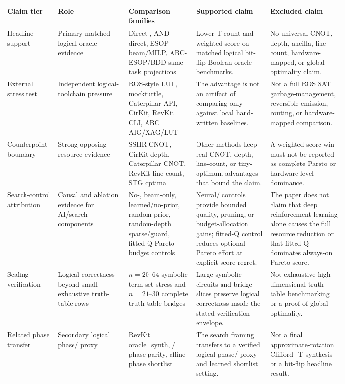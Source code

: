 \begin{tabularx}{\linewidth}{>{\raggedright\arraybackslash}p{0.15\linewidth}>{\raggedright\arraybackslash}p{0.21\linewidth}>{\raggedright\arraybackslash}X>{\raggedright\arraybackslash}p{0.22\linewidth}>{\raggedright\arraybackslash}p{0.22\linewidth}}
\toprule
Claim tier & Role & Comparison families & Supported claim & Excluded claim \\
\midrule
Headline support & Primary matched logical-oracle evidence & Direct \anf{}, AND-direct, ESOP beam/MILP, ABC-ESOP/BDD same-task projections & Lower T-count and weighted score on matched logical bit-flip Boolean-oracle benchmarks. & No universal CNOT, depth, ancilla, line-count, hardware-mapped, or global-optimality claim. \\
External stress test & Independent logical-toolchain pressure & ROS-style LUT, mockturtle, Caterpillar API, CirKit, RevKit CLI, ABC AIG/XAG/LUT & The advantage is not an artifact of comparing only against local hand-written baselines. & Not a full ROS SAT garbage-management, reversible-emission, routing, or hardware-mapped comparison. \\
Counterpoint boundary & Strong opposing-resource evidence & SSHR CNOT, CirKit depth, Caterpillar CNOT, RevKit line count, STG optima & Other methods keep real CNOT, depth, line-count, or tiny-optimum advantages that bound the claim. & A weighted-score win must not be reported as complete Pareto or hardware-level dominance. \\
Search-control attribution & Causal and ablation evidence for AI/search components & No-\mcts{}, beam-only, learned/no-prior, random-prior, random-depth, sparse/guard, fitted-Q Pareto-budget controls & Neural/\mcts{} controls provide bounded quality, pruning, or budget-allocation gains; fitted-Q control reduces optional Pareto effort at explicit score regret. & The paper does not claim that deep reinforcement learning alone causes the full resource reduction or that fitted-Q dominates always-on Pareto score. \\
Scaling verification & Logical correctness beyond small exhaustive truth-table rows & $n=20$--$64$ symbolic term-set stress and $n=21$--$30$ complete truth-table bridges & Large symbolic circuits and bridge slices preserve logical correctness inside the stated verification envelope. & Not exhaustive high-dimensional truth-table benchmarking or a proof of global optimality. \\
Related phase transfer & Secondary logical phase/\rz{} proxy & RevKit oracle\_synth, \anf{}/\fprm{} phase parity, affine phase shortlist & The search framing transfers to a verified logical phase/\rz{} proxy and learned shortlist setting. & Not a final approximate-rotation Clifford+T synthesis or a bit-flip headline result. \\
\bottomrule
\end{tabularx}
